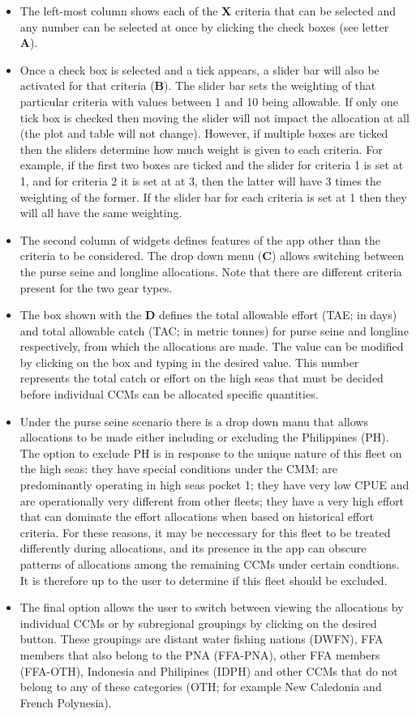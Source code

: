 \documentclass[11pt]{article}
\begin{document}
\begin{itemize}
\item The left-most column shows each of the {\bf X} criteria that can be selected and any number can be selected at once by clicking the check boxes (see letter {\bf A}).
\item Once a check box is selected and a tick appears, a slider bar will also be activated for that criteria ({\bf B}). The slider bar sets the weighting of that particular criteria with values between 1 and 10 being allowable. If only one tick box is checked then moving the slider will not impact the allocation at all (the plot and table will not change). However, if multiple boxes are ticked then the sliders determine how much weight is given to each criteria. For example, if the first two boxes are ticked and the slider for criteria 1 is set at 1, and for criteria 2 it is set at at 3, then the latter will have 3 times the weighting of the former. If the slider bar for each criteria is set at 1 then they will all have the same weighting.
\item The second column of widgets defines features of the app other than the criteria to be considered. The drop down menu ({\bf C}) allows switching between the purse seine and longline allocations. Note that there are different criteria present for the two gear types.
\item The box shown with the {\bf D} defines the total allowable effort (TAE; in days) and total allowable catch (TAC; in metric tonnes) for purse seine and longline respectively, from which the allocations are made. The value can be modified by clicking on the box and typing in the desired value. This number represents the total catch or effort on the high seas that must be decided before individual CCMs can be allocated specific quantities.
\item Under the purse seine scenario there is a drop down manu that allows allocations to be made either including or excluding the Philippines (PH). The option to exclude PH is in response to the unique nature of this fleet on the high seas: they have special conditions under the CMM; are predominantly operating in high seas pocket 1; they have very low CPUE and are operationally very different from other fleets; they have a very high effort that can dominate the effort allocations when based on historical effort criteria. For these reasons, it may be neccessary for this fleet to be treated differently during allocations, and its presence in the app can obscure patterns of allocations among the remaining CCMs under certain condtions. It is therefore up to the user to determine if this fleet should be excluded.
\item The final option allows the user to switch between viewing the allocations by individual CCMs or by subregional groupings by clicking on the desired button. These groupings are distant water fishing nations (DWFN), FFA members that also belong to the PNA (FFA-PNA), other FFA members (FFA-OTH), Indonesia and Philipines (IDPH) and other CCMs that do not belong to any of these categories (OTH; for example New Caledonia and French Polynesia).
\end{itemize}
\end{document}
